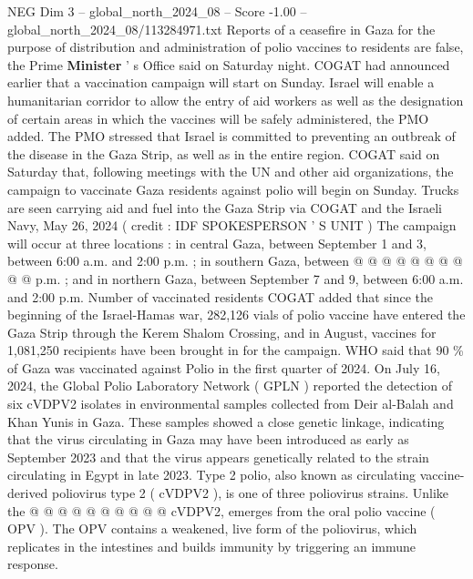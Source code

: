 \begin{textsample}{NEG Dim 3 – global\_north\_2024\_08 – Score -1.00 – global\_north\_2024\_08/113284971.txt}  \label{ex:f3_neg_318}
Reports of a ceasefire in Gaza for the purpose of distribution and administration of polio vaccines to residents are false, the Prime \textbf{Minister} ' s Office said on Saturday night.
COGAT had announced earlier that a vaccination campaign will start on Sunday.
Israel will enable a humanitarian corridor to allow the entry of aid workers as well as the designation of certain areas in which the vaccines will be safely administered, the PMO added.
The PMO stressed that Israel is committed to preventing an outbreak of the disease in the Gaza Strip, as well as in the entire region.
COGAT said on Saturday that, following meetings with the UN and other aid organizations, the campaign to vaccinate Gaza residents against polio will begin on Sunday.
Trucks are seen carrying aid and fuel into the Gaza Strip via COGAT and the Israeli Navy, May 26, 2024 ( credit : IDF SPOKESPERSON ' S UNIT ) The campaign will occur at three locations : in central Gaza, between September 1 and 3, between 6:00 a.m. and 2:00 p.m. ; in southern Gaza, between @ @ @ @ @ @ @ @ @ @ p.m. ; and in northern Gaza, between September 7 and 9, between 6:00 a.m. and 2:00 p.m.
Number of vaccinated residents COGAT added that since the beginning of the Israel-Hamas war, 282,126 vials of polio vaccine have entered the Gaza Strip through the Kerem Shalom Crossing, and in August, vaccines for 1,081,250 recipients have been brought in for the campaign.
WHO said that 90 \% of Gaza was vaccinated against Polio in the first quarter of 2024.
On July 16, 2024, the Global Polio Laboratory Network ( GPLN ) reported the detection of six cVDPV2 isolates in environmental samples collected from Deir al-Balah and Khan Yunis in Gaza.
These samples showed a close genetic linkage, indicating that the virus circulating in Gaza may have been introduced as early as September 2023 and that the virus appears genetically related to the strain circulating in Egypt in late 2023.
Type 2 polio, also known as circulating vaccine-derived poliovirus type 2 ( cVDPV2 ), is one of three poliovirus strains.
Unlike the @ @ @ @ @ @ @ @ @ @ cVDPV2, emerges from the oral polio vaccine ( OPV ).
The OPV contains a weakened, live form of the poliovirus, which replicates in the intestines and builds immunity by triggering an immune response.

\end{textsample}
